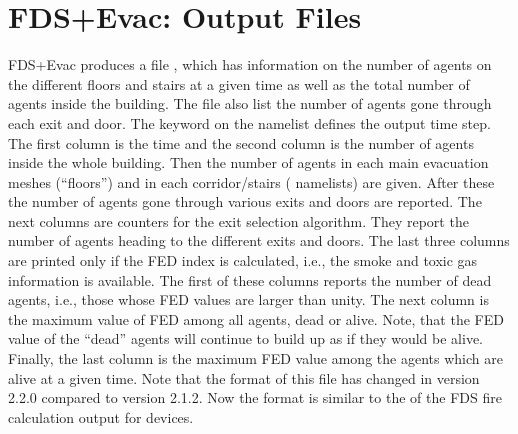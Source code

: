 \documentclass[12pt,a4paper,final,twoside]{stylevk}
\begin{document}
\section{FDS+Evac: Output Files}\label{Sec_OutFiles}

\noindent FDS+Evac produces a file , which has
information on the number of agents on the different floors and stairs
at a given time as well as the total number of agents inside the
building.  The file also list the number of agents gone through each
exit and door.  The keyword  on the 
namelist defines the output time step.  The first column is the time
and the second column is the number of agents inside the whole
building.  Then the number of agents in each main evacuation meshes
(``floors'') and in each corridor/stairs ( namelists) are
given.  After these the number of agents gone through various exits
and doors are reported.  The next columns are counters for the exit
selection algorithm.  They report the number of agents heading to the
different exits and doors.  The last three columns are printed only if
the FED index is calculated, i.e., the smoke and toxic gas
information is available.  The first of these columns reports the
number of dead agents, i.e., those whose FED values are larger
than unity.  The next column is the maximum value of FED among all
agents, dead or alive.  Note, that the FED value of the ``dead''
agents will continue to build up as if they would be alive.  Finally,
the last column is the maximum FED value among the agents which are
alive at a given time.  Note that the format of this file has changed
in version 2.2.0 compared to version 2.1.2.  Now the format is similar
to the  of the FDS fire calculation output for
devices.
\end{document}

